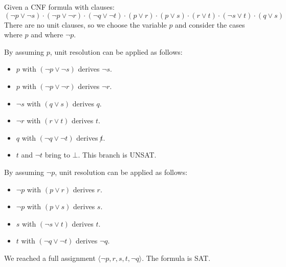 \begin{example}
    Given a CNF formula with clauses:
    \[ (\lnot p \vee \lnot s) \cdot (\lnot p \vee \lnot r) \cdot (\lnot q \vee \lnot t) \cdot (p \vee r) \cdot (p \vee s) \cdot (r \vee t) \cdot (\lnot s \vee t) \cdot (q \vee s) \]
    There are no unit clauses, so we choose the variable $p$ and consider the cases where $p$ and where $\lnot p$.

    By assuming $p$, unit resolution can be applied as follows:
    \begin{itemize}
        \item $p$ with $(\lnot p \vee \lnot s)$ derives $\lnot s$.
        \item $p$ with $(\lnot p \vee \lnot r)$ derives $\lnot r$.
        \item $\lnot s$ with $(q \vee s)$ derives $q$.
        \item $\lnot r$ with $(r \vee t)$ derives $t$.
        \item $q$ with $(\lnot q \vee \lnot t)$ derives $\not t$.
        \item $t$ and $\lnot t$ bring to $\bot$. This branch is UNSAT.
    \end{itemize}

    By assuming $\lnot p$, unit resolution can be applied as follows:
    \begin{itemize}
        \item $\lnot p$ with $(p \vee r)$ derives $r$.
        \item $\lnot p$ with $(p \vee s)$ derives $s$.
        \item $s$ with $(\lnot s \vee t)$ derives $t$.
        \item $t$ with $(\lnot q \vee \lnot t)$ derives $\lnot q$.
    \end{itemize}
    We reached a full assignment $\langle \lnot p, r, s, t, \lnot q \rangle$. The formula is SAT.
\end{example}

